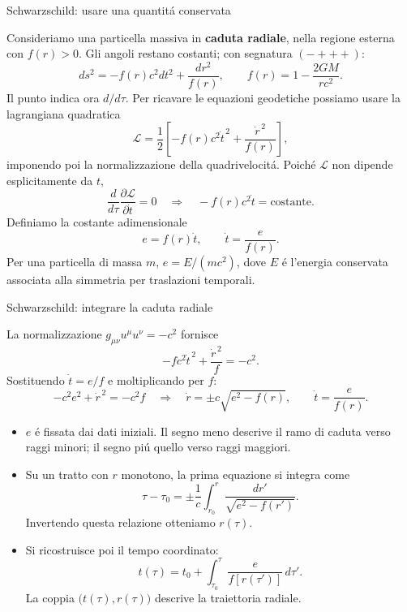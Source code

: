 \begin{frame}[t]{Schwarzschild: usare una quantit\'a conservata}
\small\raggedright
Consideriamo una particella massiva in \textbf{caduta radiale}, nella regione
esterna con $f(r)>0$. Gli angoli restano costanti; con segnatura $(-+++)$:
\[
ds^2=-f(r)c^2dt^2+\frac{dr^2}{f(r)},\qquad
f(r)=1-\frac{2GM}{rc^2}.
\]
Il punto indica ora $d/d\tau$. Per ricavare le equazioni geodetiche
possiamo usare la lagrangiana quadratica
\[
\mathcal L=\frac12\left[-f(r)c^2\dot t^{\,2}
+\frac{\dot r^{\,2}}{f(r)}\right],
\]
imponendo poi la normalizzazione della quadrivelocit\'a.
Poich\'e $\mathcal L$ non dipende esplicitamente da $t$,
\[
\frac{d}{d\tau}\frac{\partial\mathcal L}{\partial\dot t}=0
\quad\Longrightarrow\quad
-f(r)c^2\dot t=\text{costante}.
\]
Definiamo la costante adimensionale
\[
\boxed{e=f(r)\dot t,\qquad \dot t=\frac{e}{f(r)}.}
\]
Per una particella di massa $m$, $e=E/(mc^2)$, dove $E$ \'e l'energia
conservata associata alla simmetria per traslazioni temporali.
\end{frame}

\begin{frame}[t]{Schwarzschild: integrare la caduta radiale}
\small\raggedright
La normalizzazione $g_{\mu\nu}u^\mu u^\nu=-c^2$ fornisce
\[
-fc^2\dot t^{\,2}+\frac{\dot r^{\,2}}{f}=-c^2.
\]
Sostituendo $\dot t=e/f$ e moltiplicando per $f$:
\[
-c^2e^2+\dot r^{\,2}=-c^2f
\quad\Longrightarrow\quad
\boxed{\dot r=\pm c\sqrt{e^2-f(r)},\qquad
\dot t=\frac{e}{f(r)}.}
\]
\begin{itemize}
\item $e$ \'e fissata dai dati iniziali. Il segno meno descrive il ramo
di caduta verso raggi minori; il segno pi\'u quello verso raggi maggiori.
\item Su un tratto con $r$ monotono, la prima equazione si integra come
\[
\boxed{\tau-\tau_0=\pm\frac1c\int_{r_0}^{r}
\frac{dr'}{\sqrt{e^2-f(r')}}.}
\]
Invertendo questa relazione otteniamo $r(\tau)$.
\item Si ricostruisce poi il tempo coordinato:
\[
t(\tau)=t_0+\int_{\tau_0}^{\tau}
\frac{e}{f[r(\tau')]}\,d\tau'.
\]
La coppia $\bigl(t(\tau),r(\tau)\bigr)$ descrive la traiettoria radiale.
\end{itemize}
\end{frame}

